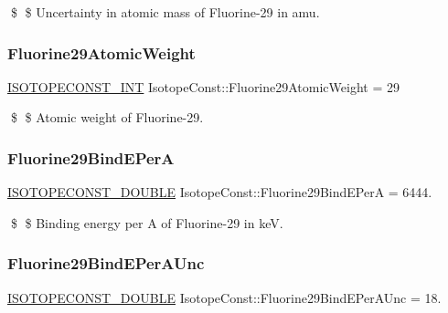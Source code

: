 \$ \$ Uncertainty in atomic mass of Fluorine-\/29 in amu. \mbox{\label{group___isotope_const-_fluorine-_f29_gaebb82f2e96cb5b3251f796ab190d8583}} 
\subsubsection{\texorpdfstring{Fluorine29\+Atomic\+Weight}{Fluorine29AtomicWeight}}
{\footnotesize\ttfamily \mbox{\hyperlink{group___isotope_const-_macros_ga5f18360b3e99483a35c32d789e62621c}{I\+S\+O\+T\+O\+P\+E\+C\+O\+N\+S\+T\+\_\+\+I\+NT}} Isotope\+Const\+::\+Fluorine29\+Atomic\+Weight = 29}

\$ \$ Atomic weight of Fluorine-\/29. \mbox{\label{group___isotope_const-_fluorine-_f29_gaa74e02ec1350b7b015787a8d9c593d8a}} 
\subsubsection{\texorpdfstring{Fluorine29\+Bind\+E\+PerA}{Fluorine29BindEPerA}}
{\footnotesize\ttfamily \mbox{\hyperlink{group___isotope_const-_macros_ga8f45a7272ce02c0b4c65c44636ed719a}{I\+S\+O\+T\+O\+P\+E\+C\+O\+N\+S\+T\+\_\+\+D\+O\+U\+B\+LE}} Isotope\+Const\+::\+Fluorine29\+Bind\+E\+PerA = 6444.}

\$ \$ Binding energy per A of Fluorine-\/29 in keV. \mbox{\label{group___isotope_const-_fluorine-_f29_gac4ccb702846f31df9ce16fba073f84d5}} 
\subsubsection{\texorpdfstring{Fluorine29\+Bind\+E\+Per\+A\+Unc}{Fluorine29BindEPerAUnc}}
{\footnotesize\ttfamily \mbox{\hyperlink{group___isotope_const-_macros_ga8f45a7272ce02c0b4c65c44636ed719a}{I\+S\+O\+T\+O\+P\+E\+C\+O\+N\+S\+T\+\_\+\+D\+O\+U\+B\+LE}} Isotope\+Const\+::\+Fluorine29\+Bind\+E\+Per\+A\+Unc = 18.}

